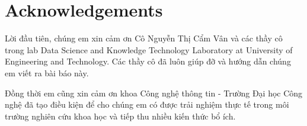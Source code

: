 \chapter*{Acknowledgements}

Lời đầu tiên, chúng em xin cảm ơn Cô Nguyễn Thị Cẩm Vân và các thầy cô trong lab  Data Science and Knowledge Technology Laboratory at University of Engineering and Technology. Các thầy cô đã luôn giúp đỡ và hướng dẫn chúng em viết ra bài báo này.






Đồng thời em cũng xin cảm ơn khoa Công nghệ thông tin - Trường Đại học Công nghệ đã tạo điều kiện để cho chúng em có được trải nghiệm thực tế trong môi trường nghiên cứu khoa học và tiếp thu nhiều kiến thức bổ ích.